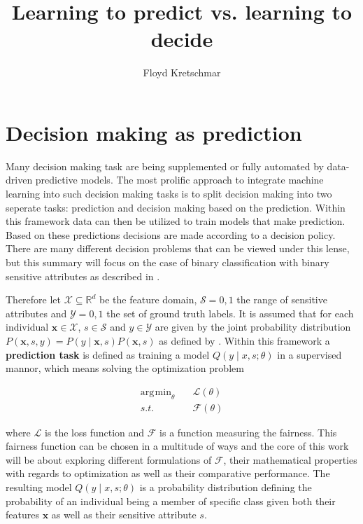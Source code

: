 \documentclass[
	a4paper,
	11pt
	]{article}
\title{Learning to predict vs. learning to decide}
\author{Floyd Kretschmar}
\DeclareMathOperator*{\argmin}{\arg\!\min}
\begin{document}
\maketitle

\section{Decision making as prediction}
\label{sec:decision_as_pred}
Many decision making task are being supplemented or fully automated by data-driven predictive models. The most prolific approach to integrate machine learning into such decision making tasks is to split decision making into two seperate tasks: prediction and decision making based on the prediction. Within this framework data can then be utilized to train models that make prediction. Based on these predictions decisions are made according to a decision policy. There are many different decision problems that can be viewed under this lense, but this summary will focus on the case of binary classification with binary sensitive attributes as described in \cite{Kilbertus19}.

Therefore let $\mathcal{X} \subseteq \mathbb{R}^{d}$ be the feature domain, $\mathcal{S} = {0,1}$ the range of sensitive attributes and $\mathcal{Y} = {0, 1}$ the set of ground truth labels. It is assumed that for each individual $\boldsymbol{x} \in \mathcal{X}$, $s \in \mathcal{S}$ and $y \in \mathcal{Y}$ are given by the joint probability distribution $P(\boldsymbol{x}, s, y) = P(y \mid \boldsymbol{x}, s)P(\boldsymbol{x}, s)$ as defined by \cite{Kilbertus19}. Within this framework a \textbf{prediction task} is defined as training a model $Q(y \mid x, s; \theta)$ in a supervised mannor, which means solving the optimization problem 

\begin{align*}
    \argmin_{\theta} &\quad \mathcal{L}(\theta) \\
    s.t.&\quad \mathcal{F}(\theta)
\end{align*}

where $\mathcal{L}$ is the loss function and $\mathcal{F}$ is a function measuring the fairness. This fairness function can be chosen in a multitude of ways and the core of this work will be about exploring different formulations of $\mathcal{F}$, their mathematical properties with regards to optimization as well as their comparative performance. The resulting model $Q(y \mid x, s; \theta)$ is a probability distribution defining the probability of an individual being a member of specific class given both their features $\boldsymbol{x}$ as well as their sensitive attribute $s$.
\end{document}
